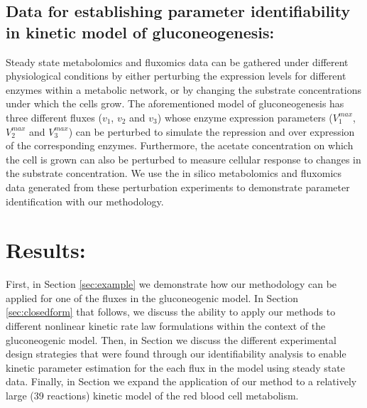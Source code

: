 \documentclass[10pt]{article}
\begin{document}
\subsection{Data for establishing parameter identifiability in kinetic model of gluconeogenesis:}
Steady state metabolomics and fluxomics data can be gathered under different physiological conditions by either perturbing the expression levels for different enzymes within a metabolic network, or by changing the substrate concentrations under which the cells grow. The aforementioned model of gluconeogenesis has three different fluxes ($v_1$, $v_2$ and $v_3$) whose enzyme expression parameters ($V_1^{max}$, $V_2^{max}$ and $V_3^{max}$) can be perturbed to simulate the repression and over expression of the corresponding enzymes. Furthermore, the acetate concentration on which the cell is grown can also be perturbed to measure cellular response to changes in the substrate concentration. We use the in silico metabolomics and fluxomics data generated from these perturbation experiments to demonstrate parameter identification with our methodology. 

\section{Results:}
First, in Section \ref{sec:example} we demonstrate how our methodology can be applied for one of the fluxes in the gluconeogenic model. In Section \ref{sec:closedform} that follows, we discuss the ability to apply our methods to different nonlinear kinetic rate law formulations within the context of the gluconeogenic model. Then, in Section we discuss the different experimental design strategies that were found through our identifiability analysis to enable kinetic parameter estimation for the each flux in the model using steady state data. Finally, in Section we expand the application of our method to a relatively large (39 reactions) kinetic model of the red blood cell metabolism.
\end{document}
